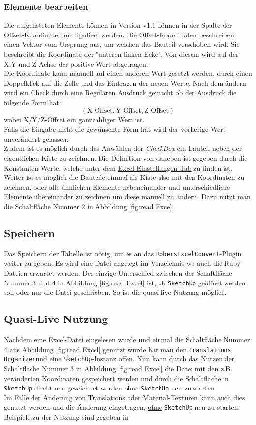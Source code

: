 \documentclass{book}
\newcommand{\sketchup}{\texttt{SketchUp}\xspace}
\newcommand{\robersexcelconvert}{\texttt{RobersExcelConvert}\xspace}
\newcommand{\assisttool}{\texttt{Translations Organizer}}
\begin{document}
			\subsubsection{Elemente bearbeiten} \label{element bearbeiten}
				Die aufgelisteten Elemente können in Version v1.1 können in der Spalte der Offset-Koordinaten manipuliert werden. Die Offset-Koordinaten beschreiben einen Vektor vom Ursprung aus, um welchen das Bauteil verschoben wird. Sie beschreibt die Koordinate der "unteren linken Ecke". Von diesem wird auf der X,Y und Z-Achse der positive Wert abgetragen.\\
				Die Koordinate kann manuell auf einen anderen Wert gesetzt werden, durch einen Doppelklick auf die Zelle und das Eintragen der neuen Werte. Nach dem ändern wird ein Check durch eine Regulären Ausdruck gemacht ob der Ausdruck die folgende Form hat:
					$$ ( \text{X-Offset}, \text{Y-Offset}, \text{Z-Offset})$$
				wobei X/Y/Z-Offset ein ganzzahliger Wert ist.\\
				Falls die Eingabe nicht die gewünschte Form hat wird der vorherige Wert unverändert gelassen.\\
				Zudem ist es möglich durch das Anwählen der \textit{CheckBox} ein Bauteil neben der eigentlichen Kiste zu zeichnen. Die Definition von \glqq daneben \grqq ist gegeben durch die Konstanten-Werte, welche unter dem \hyperref[excel konstanten]{Excel-Einstellungen-Tab} zu finden ist.\\
				Weiter ist es möglich die Bauteile einmal als Kiste also mit den Koordinaten zu zeichnen, oder alle ähnlichen Elemente nebeneinander und unterschiedliche Elemente übereinander zu zeichnen um diese manuell zu ändern. Dazu nutzt man die Schaltfläche Nummer 2 in Abbildung \ref{fig:read Excel}.
			\subsection{Speichern}
				Das Speichern der Tabelle ist nötig, um es an das \robersexcelconvert-Plugin weiter zu geben. Es wird eine Datei angelegt im Verzeichnis wo auch die Ruby-Dateien erwartet werden. Der einzige Unterschied zwischen der Schaltfläche Nummer 3 und 4 in Abbildung \ref{fig:read Excel} ist, ob \sketchup geöffnet werden soll oder nur die Datei geschrieben. So ist die quasi-live Nutzung möglich. 
			\subsection{Quasi-Live Nutzung}
				Nachdem eine Excel-Datei eingelesen wurde und einmal die Schaltfläche Nummer 4 aus Abbildung \ref{fig:read Excel} genutzt wurde hat man den \assisttool und eine \sketchup-Instanz offen. Nun kann durch das Nutzen der Schaltfläche Nummer 3 in Abbildung \ref{fig:read Excel} die Datei mit den z.B. veränderten Koordinaten gespeichert werden und durch die Schaltfläche in \sketchup direkt neu gezeichnet werden ohne \sketchup neu zu starten.\\
				Im Falle der Änderung von Translations oder Material-Texturen kann auch dies genutzt werden und die Änderung eingetragen, \underline{ohne} \sketchup neu zu starten. Beispiele zu der Nutzung sind gegeben in %
\end{document}
